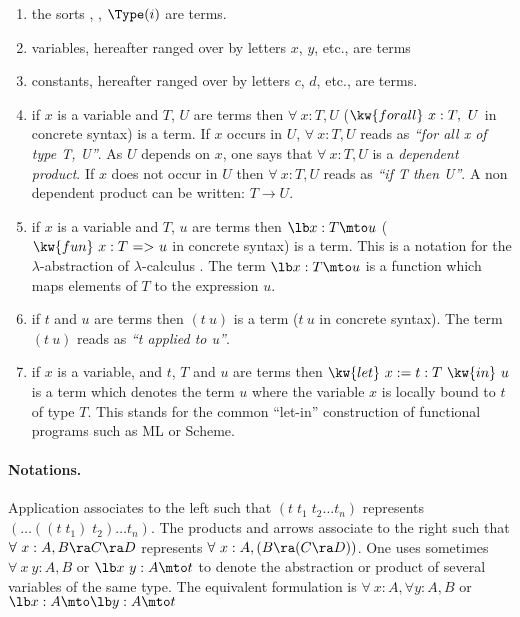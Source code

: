 \begin{enumerate}
\item the sorts {\Set}, {\Prop}, ${\Type(i)}$ are terms.
\item variables, hereafter ranged over by letters $x$, $y$, etc., are terms
\item constants, hereafter ranged over by letters $c$, $d$, etc.,  are terms.
\item if $x$ is a variable and $T$, $U$ are terms then $\forall~x:T,U$
  ($\kw{forall}~x:T,~U$ in \Coq{} concrete syntax) is a term. If $x$
  occurs in $U$, $\forall~x:T,U$ reads as {\it ``for all x of type T,
    U''}. As $U$ depends on $x$, one says that $\forall~x:T,U$ is a
  {\em dependent product}. If $x$ does not occur in $U$ then
  $\forall~x:T,U$ reads as {\it ``if T then U''}. A non dependent
  product can be written: $T \rightarrow U$.
\item if $x$ is a variable and $T$, $u$ are terms then $\lb x:T \mto u$
  ($\kw{fun}~x:T~ {\tt =>}~ u$ in \Coq{} concrete syntax) is a term. This is a
  notation for the $\lambda$-abstraction of
  $\lambda$-calculus
  \cite{Bar81}. The term $\lb x:T \mto u$ is a function which maps
  elements of $T$ to the expression $u$.
\item if $t$ and $u$ are terms then $(t\ u)$ is a term  
 ($t~u$ in \Coq{} concrete syntax).  The term $(t\ 
  u)$ reads as {\it ``t applied to u''}.
\item if $x$ is a variable, and $t$, $T$ and $u$ are terms then
  $\kw{let}~x:=t:T~\kw{in}~u$ is a
  term which denotes the term $u$ where the variable $x$ is locally
  bound to $t$ of type $T$. This stands for the common ``let-in''
  construction of functional programs such as ML or Scheme.
\end{enumerate}

\paragraph{Notations.} Application associates to the left such that
$(t\;t_1\;t_2\ldots t_n)$ represents $(\ldots ((t\;t_1)\;t_2)\ldots t_n)$. The
products and arrows associate to the right such that $\forall~x:A,B\ra C\ra
D$ represents $\forall~x:A,(B\ra (C\ra D))$.  One uses sometimes
$\forall~x~y:A,B$ or
$\lb x~y:A\mto t$ to denote the abstraction or product of several variables
of the same type. The equivalent formulation is $\forall~x:A, \forall y:A,B$ or
$\lb x:A \mto \lb y:A \mto t$


